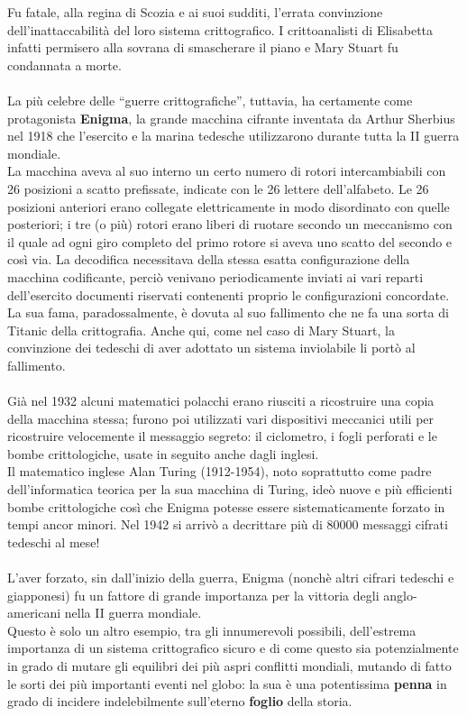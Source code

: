 Fu fatale, alla regina di Scozia e ai suoi sudditi, l’errata convinzione dell'inattaccabilità del loro sistema crittografico. I crittoanalisti di Elisabetta infatti permisero alla sovrana di smascherare il piano e Mary Stuart fu condannata a morte.\\\\
La più celebre delle ``guerre crittografiche'', tuttavia, ha certamente come protagonista \textbf{Enigma}, la grande macchina cifrante inventata da Arthur Sherbius nel 1918 che l'esercito e la marina tedesche utilizzarono durante tutta la II guerra mondiale.\\
La macchina aveva al suo interno un certo numero di rotori intercambiabili con 26 posizioni a scatto prefissate, indicate con le 26 lettere dell'alfabeto. Le 26 posizioni anteriori erano collegate elettricamente in modo disordinato con quelle posteriori; i tre (o più) rotori erano liberi di ruotare secondo un meccanismo con il quale ad ogni giro completo del primo rotore si aveva uno scatto del secondo e così via.
La decodifica necessitava della stessa esatta configurazione della macchina codificante, perciò venivano periodicamente inviati ai vari reparti dell'esercito documenti riservati contenenti proprio le configurazioni concordate.\\
La sua fama, paradossalmente, è dovuta al suo fallimento che ne fa una sorta di Titanic della crittografia. Anche qui, come nel caso di Mary Stuart, la convinzione dei tedeschi di aver adottato un sistema inviolabile li portò al fallimento.\\\\
Già nel 1932 alcuni matematici polacchi erano riusciti a ricostruire una copia della macchina stessa; furono poi utilizzati vari dispositivi meccanici utili per ricostruire velocemente il messaggio segreto: il ciclometro, i fogli perforati e le bombe crittologiche, usate in seguito anche dagli inglesi.\\
Il matematico inglese Alan Turing (1912-1954), noto soprattutto come padre dell'informatica teorica per la sua macchina di Turing, ideò nuove e più efficienti bombe crittologiche così che Enigma potesse essere sistematicamente forzato in tempi ancor minori. Nel 1942 si arrivò a decrittare più di 80000 messaggi cifrati tedeschi al mese!\\\\
L'aver forzato, sin dall'inizio della guerra, Enigma (nonchè altri cifrari tedeschi e giapponesi) fu un fattore di grande importanza per la vittoria degli anglo-americani nella II guerra mondiale.\\
Questo è solo un altro esempio, tra gli innumerevoli possibili, dell'estrema importanza di un sistema crittografico sicuro e di come questo sia potenzialmente in grado di mutare gli equilibri dei più aspri conflitti mondiali, mutando di fatto le sorti dei più importanti eventi nel globo: la sua è una potentissima \textbf{penna} in grado di incidere indelebilmente sull'eterno \textbf{foglio} della storia.
